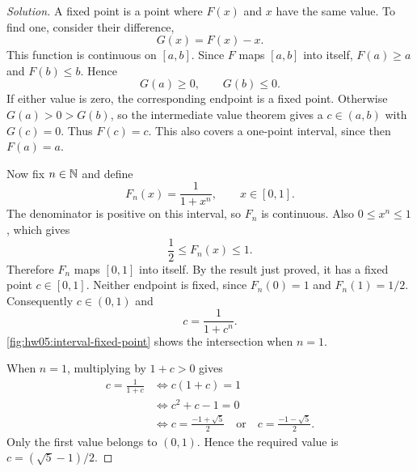 \begin{proof}[Solution]
  A fixed point is a point where $F(x)$ and $x$ have the same value. To
  find one, consider their difference,
  \[
    G(x)=F(x)-x.
  \]
  This function is continuous on $[a,b]$. Since $F$ maps $[a,b]$ into
  itself, $F(a)\ge a$ and $F(b)\le b$. Hence
  \[
    G(a)\ge0,\qquad G(b)\le0.
  \]
  If either value is zero, the corresponding endpoint is a fixed point.
  Otherwise $G(a)>0>G(b)$, so the intermediate value theorem gives a
  $c\in(a,b)$ with $G(c)=0$. Thus $F(c)=c$. This also covers a
  one-point interval, since then $F(a)=a$.

  Now fix $n\in\mathbb{N}$ and define
  \[
    F_n(x)=\frac{1}{1+x^n},\qquad x\in[0,1].
  \]
  The denominator is positive on this interval, so $F_n$ is continuous.
  Also $0\le x^n\le1$, which gives
  \[
    \frac12\le F_n(x)\le1.
  \]
  Therefore $F_n$ maps $[0,1]$ into itself. By the result just proved,
  it has a fixed point $c\in[0,1]$. Neither endpoint is fixed, since
  $F_n(0)=1$ and $F_n(1)=1/2$. Consequently $c\in(0,1)$ and
  \[
    c=\frac{1}{1+c^n}.
  \]
  \autoref{fig:hw05:interval-fixed-point} shows the intersection when
  $n=1$.

  \begin{marginfigure}
    \centering
    
    \caption[A fixed point as a graph intersection.]{%
      For $n=1$, the graph $y=1/(1+x)$ crosses $y=x$
      inside the unit square. At the crossing, the input equals its output.}
    \label{fig:hw05:interval-fixed-point}
  \end{marginfigure}

  When $n=1$, multiplying by $1+c>0$ gives
  \begin{align*}
    c=\frac{1}{1+c}
      &\iff c(1+c)=1\\
      &\iff c^2+c-1=0\\
      &\iff c=\frac{-1+\sqrt5}{2}
        \quad\text{or}\quad c=\frac{-1-\sqrt5}{2}.
  \end{align*}
  Only the first value belongs to $(0,1)$. Hence the required value is
  $c=(\sqrt5-1)/2$.
\end{proof}
